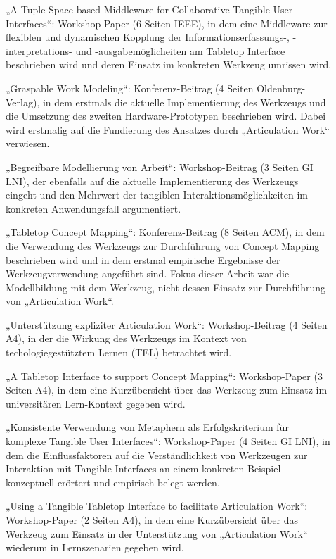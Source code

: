 \begin{description}
	\item[\citet{Furtmuller07a}] „A Tuple-Space based Middleware for Collaborative Tangible User Interfaces“: Workshop-Paper (6 Seiten IEEE), in dem eine Middleware zur flexiblen und dynamischen Kopplung der Informationserfassungs-, -interpretations- und -ausgabemöglicheiten am Tabletop Interface beschrieben wird und deren Einsatz im konkreten Werkzeug umrissen wird.
	\item[\citet{Oppl08}] „Graspable Work Modeling“: Konferenz-Beitrag (4 Seiten Oldenburg-Verlag), in dem erstmals die aktuelle Implementierung des Werkzeugs und die Umsetzung des zweiten Hardware-Prototypen beschrieben wird. Dabei wird erstmalig auf die Fundierung des Ansatzes durch „Articulation Work“ verwiesen.
	\item[\citet{Oppl08a}] „Begreifbare Modellierung von Arbeit“: Workshop-Beitrag (3 Seiten GI LNI), der ebenfalls auf die aktuelle Implementierung des Werkzeugs eingeht und den Mehrwert der tangiblen Interaktionsmöglichkeiten im konkreten Anwendungsfall argumentiert.
	\item[\citet{Oppl09}] „Tabletop Concept Mapping“: Konferenz-Beitrag (8 Seiten ACM), in dem die Verwendung des Werkzeugs zur Durchführung von Concept Mapping beschrieben wird und in dem erstmal empirische Ergebnisse der Werkzeugverwendung angeführt sind. Fokus dieser Arbeit war die Modellbildung mit dem Werkzeug, nicht dessen Einsatz zur Durchführung von „Articulation Work“.
	\item[\citet{Oppl09b}] „Unterstützung expliziter Articulation Work“: Workshop-Beitrag (4 Seiten A4), in der die Wirkung des Werkzeugs im Kontext von techologiegestütztem Lernen (\gls{TEL}) betrachtet wird. 
	\item[\citet{Oppl09c}] „A Tabletop Interface to support Concept Mapping“: Workshop-Paper (3 Seiten A4), in dem eine Kurzübersicht über das Werkzeug zum Einsatz im universitären Lern-Kontext gegeben wird.
	\item[\citet{Oppl09d}] „Konsistente Verwendung von Metaphern als Erfolgskriterium für komplexe Tangible User Interfaces“: Workshop-Paper (4 Seiten GI LNI), in dem die Einflussfaktoren auf die Verständlichkeit von Werkzeugen zur Interaktion mit Tangible Interfaces an einem konkreten Beispiel konzeptuell erörtert und empirisch belegt werden.
	\item[\citet{Oppl09e}] „Using a Tangible Tabletop Interface to facilitate Articulation Work“: Workshop-Paper (2 Seiten A4), in dem eine Kurzübersicht über das Werkzeug zum Einsatz in der Unterstützung von „Articulation Work“ wiederum in Lernszenarien gegeben wird.

\end{description}
